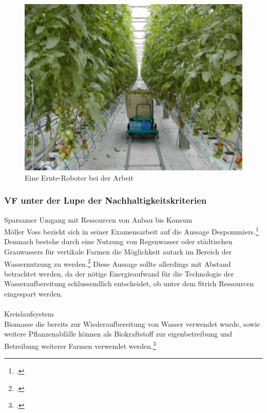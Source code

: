 \documentclass{scrartcl}
\begin{document}
\begin{figure}[htbp]
\centering
\includegraphics[width=14cm]{image_folder/automatisation_kondo.png}
\caption{Eine Ernte-Roboter bei der Arbeit}
\label{fig:Automatisierung}
\end{figure}

\subsubsection{VF unter der Lupe der Nachhaltigkeitskriterien}

Sparsamer Umgang mit Ressourcen von Anbau bis Konsum\\
Möller Voss bezieht sich in seiner Examensarbeit auf die Aussage Despommiers.\footcite[S.9]{PeterMollerVoss2013VerticalRise} Demnach bestehe durch eine Nutzung von Regenwasser oder städtischen Grauwassers für vertikale Farmen die Möglichkeit autark im Bereich der Wassernutzung zu werden.\footcites[Vgl.]{Despommier2010TheCentury.} Diese Aussage sollte allerdings mit Abstand betrachtet werden, da der nötige Energieaufwand für die Technologie der Wasseraufbereitung schlussendlich entscheidet, ob unter dem Strich Ressourcen eingespart werden.\\
\\
Kreislaufsystem\\
Biomasse die bereits zur Wiederaufbereitung von Wasser verwendet wurde, sowie weitere Pflanzenabfälle können als Biokraftstoff zur eigenbetreibung und Betreibung weiterer Farmen verwendet werden.\footcites[Vgl.][S.80ff]{Despommier2009TheFarms}\\
\end{document}
